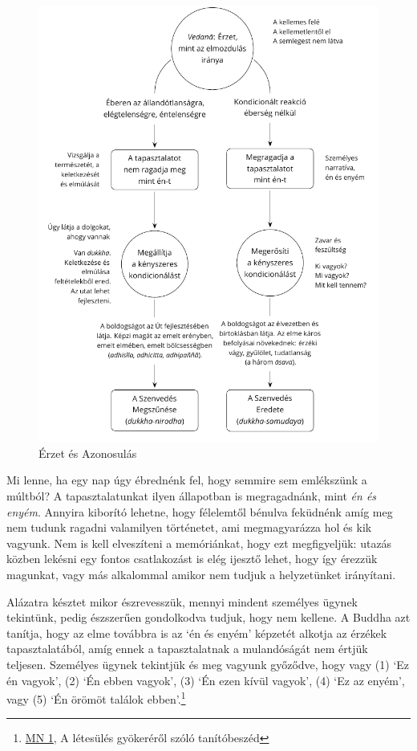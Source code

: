 \begin{figure}[h]
\caption{Érzet és Azonosulás}\label{fig-feeling-identification}
\bigskip
\includegraphics[width=\linewidth]{./manuscript/tex/diagrams/feeling-identification-hu.pdf}
\end{figure}

\clearpage
\normalpagelayout

Mi lenne, ha egy nap úgy ébrednénk fel, hogy semmire sem emlékszünk a
múltból? A tapasztalatunkat ilyen állapotban is megragadnánk, mint
\emph{én és enyém}. Annyira kiborító lehetne, hogy félelemtől bénulva
feküdnénk amíg meg nem tudunk ragadni valamilyen történetet, ami
megmagyarázza hol és kik vagyunk. Nem is kell elveszíteni a memóriánkat,
hogy ezt megfigyeljük: utazás közben lekésni egy fontos csatlakozást is
elég ijesztő lehet, hogy így érezzük magunkat, vagy más alkalommal
amikor nem tudjuk a helyzetünket irányítani.

Alázatra késztet mikor észrevesszük, mennyi mindent személyes ügynek
tekintünk, pedig észszerűen gondolkodva tudjuk, hogy nem kellene. A
Buddha azt tanítja, hogy az elme továbbra is az `én és enyém' képzetét
alkotja az érzékek tapasztalatából, amíg ennek a tapasztalatnak a
mulandóságát nem értjük teljesen. Személyes ügynek tekintjük és meg
vagyunk győződve, hogy vagy (1) `Ez én vagyok', (2) `Én ebben vagyok',
(3) `Én ezen kívül vagyok', (4) `Ez az enyém', vagy (5) `Én örömöt
találok ebben'.\footnote{\href{https://a-buddha-ujja.hu/mn-1/hu/pressing-lajos}{MN
  1}, A létesülés gyökeréről szóló tanítóbeszéd}

